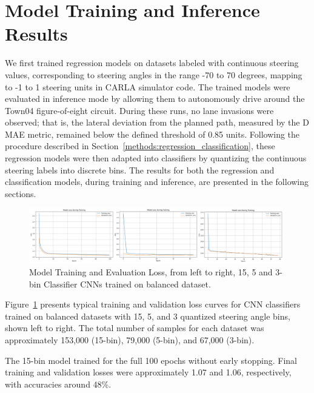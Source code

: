
\section{Model Training and Inference Results}

We first trained regression models on datasets labeled with continuous steering values, corresponding to steering angles in the range -70 to 70 degrees, mapping to -1 to 1 steering units in CARLA simulator code. The trained models were evaluated in inference mode by allowing them to autonomously drive around the Town04 figure-of-eight circuit. During these runs, no lane invasions were observed; that is, the lateral deviation from the planned path, measured by the D MAE metric, remained below the defined threshold of 0.85 units. Following the procedure described in Section~\ref{methods:regression_classification}, these regression models were then adapted into classifiers by quantizing the continuous steering labels into discrete bins. The results for both the regression and classification models, during training and inference, are presented in the following sections.

\begin{figure}[h]
\centering
\includegraphics[width=0.99\textwidth]{Figures/Results/CNN_15_5_3_balanced_training.png}
\caption{Model Training and Evaluation Loss, from left to right, 15, 5 and 3-bin Classifier CNNs trained on balanced dataset.}
\label{fig:CNN_15_5_3_balanced_training}
\end{figure}

Figure~\ref{fig:CNN_15_5_3_balanced_training} presents typical training and validation loss curves for CNN classifiers trained on balanced datasets with 15, 5, and 3 quantized steering angle bins, shown left to right. The total number of samples for each dataset was approximately 153,000 (15-bin), 79,000 (5-bin), and 67,000 (3-bin).

The 15-bin model trained for the full 100 epochs without early stopping. Final training and validation losses were approximately 1.07 and 1.06, respectively, with accuracies around 48\%.



